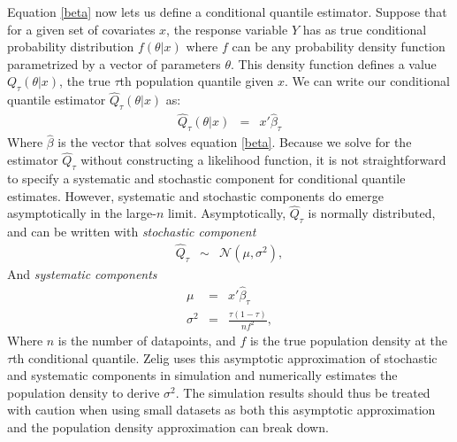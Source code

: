Equation \ref{beta} now lets us define a conditional quantile estimator.
Suppose that for a given set of covariates $x$, the response variable $Y$ has as true
conditional probability distribution $f(\theta | x)$ where $f$ can be any probability
density function parametrized by a vector of parameters $\theta$.
This density function defines a value $Q_\tau(\theta|x)$, the true $\tau$th population
quantile given $x$. We can write our conditional quantile estimator $\hat Q_\tau(\theta|x)$ as:
\begin{eqnarray*}
\hat Q_\tau(\theta|x) &=& x'\hat\beta_\tau
\end{eqnarray*}
Where $\hat\beta$ is the vector that solves equation \ref{beta}.
Because we solve for the estimator $\hat Q_\tau$ without constructing a likelihood function,
it is not straightforward to specify a systematic and stochastic component for conditional
quantile estimates. However, systematic and stochastic components do emerge asymptotically
in the large-$n$ limit. Asymptotically, $\hat Q_\tau$ is normally distributed, and can be
written with \emph{stochastic component}
\begin{eqnarray*}
    \hat Q_\tau &\sim& \mathcal{N}(\mu, \sigma^2),
\end{eqnarray*}
And \emph{systematic components}
\begin{eqnarray*}
    \mu &=& x'\hat\beta_\tau\\
    \sigma^2 &=& \frac{\tau(1-\tau)}{n f^2},
\end{eqnarray*}
Where $n$ is the number of
datapoints, and $f$ is the true population density at the $\tau$th conditional quantile.
Zelig uses this asymptotic approximation of stochastic and systematic components in
simulation and numerically estimates the population density to derive $\sigma^2$. The
simulation results should thus be treated with caution when using small datasets as both
this asymptotic approximation and the population density approximation can break down.

